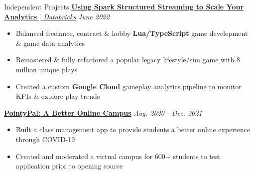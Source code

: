 \documentclass{resume/resume}
\begin{document}
\begin{rSection}{Independent Projects}
  \href{https://databricks.com/blog/2022/07/14/using-spark-structured-streaming-to-scale-your-analytics.html}{{\bf Using Spark Structured Streaming to Scale Your Analytics} | {\em Databricks}} \hfill {\em June 2022}
  \vspace{-6pt}
  \begin{itemize}[nosep]
    \item Balanced freelance, contract \& hobby {\bf Lua/TypeScript} game development \& game data analytics
    \item Remastered \& fully refactored a popular legacy lifestyle/sim game with 8 million unique plays
    \item Created a custom {\bf Google Cloud} gameplay analytics pipeline to monitor KPIs \& explore play trends
  \end{itemize}
  

  \href{https://github.com/UtahTriangle/pointypal}{\bf PointyPal: A Better Online Campus} \hfill {\em Aug. 2020 - Dec. 2021}
  \vspace{-6pt}
  \begin{itemize}[nosep]
    \item Built a class management app to provide students a better online experience through COVID-19
    \item Created and moderated a virtual campus for 600$+$ students to test application prior to opening source 
  \end{itemize}



\end{rSection}
\end{document}
